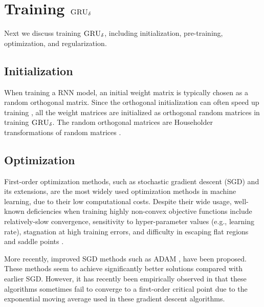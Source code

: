 \documentclass[letterpaper,12pt,titlepage,oneside,final]{book}
\numberwithin{equation}{section}
\theoremstyle{definition}
\newcommand{\model}{\textsc{GRU}_\delta}
\begin{document}
\section{Training $\model$} \label{sec:train}
Next we discuss training  $\model$,  including initialization,  pre-training,  optimization, and regularization.
\subsection{Initialization}\label{sec:init}
When training a RNN model,  an initial weight matrix is typically chosen as a random orthogonal matrix. Since the orthogonal initialization  can often speed up training \citep{le2015simple}, all the weight matrices   are initialized as orthogonal random matrices in training $\model$. The random orthogonal matrices are   Householder transformations of random matrices \citep{le2015simple}.

\subsection{Optimization}
First-order optimization methods, such as stochastic gradient descent (SGD) and its extensions,  are the most widely used optimization methods in machine learning, due to  their low computational costs. Despite their wide usage,  well-known deficiencies when  training highly non-convex objective functions include relatively-slow convergence, sensitivity to hyper-parameter values (e.g., learning rate), stagnation at high training errors, and difficulty in escaping flat regions and saddle points \citep{yao2018inexact}.

More recently,  improved SGD methods such as ADAM \citep{kingma2014adam}, have been proposed.
These methods seem to achieve significantly better solutions compared with earlier SGD. However,  it has recently been empirically observed in \cite{reddi2019convergence}  that these algorithms sometimes fail to converge to a first-order critical point due to the exponential moving average used in these gradient descent algorithms.
\end{document}
